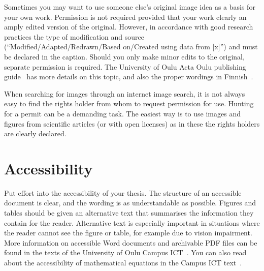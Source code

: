 Sometimes you may want to use someone else's original image idea as a
basis for your own work. Permission is not required provided that your
work clearly an amply edited version of the original. However, in
accordance with good research practices the type of modification and
source (``Modified/Adapted/Redrawn/Based on/Created using data from
[x]'') and must be declared in the caption. Should you only make minor
edits to the original, separate permission is required. The University
of Oulu Acta Oulu publishing guide~\cite{ronkainen_copyright} has more
details on this topic, and also the proper wordings in
Finnish~\cite{ronkainen_tekijanoikeus}.

When searching for images through an internet image search, it is not
always easy to find the rights holder from whom to request permission
for use. Hunting for a permit can be a demanding task. The easiest way
is to use images and figures from scientific articles (or with open
licenses) as in these the rights holders are clearly declared.

\section{Accessibility}
\label{accessibility}
Put effort into the accessibility of your thesis. The
structure of an accessible document is clear, and the wording is as
understandable as possible. Figures and tables should be given an
alternative text that summarises the information they contain for the
reader. Alternative text is especially important in situations where
the reader cannot see the figure or table, for example due to vision
impairment.  More information on accessible Word documents and
archivable PDF files can be found in the texts of the University of
Oulu Campus ICT~\cite{ictaccessibleword,ictwordpdfa}. You can also
read about the accessibility of mathematical equations in the Campus
ICT text~\cite{ictaccessiblemath}.
